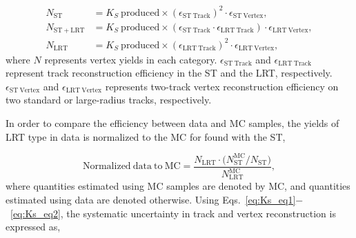 \begin{align}
    N_{\mathrm{ST}}  &= K_{S}~\mathrm{produced} \times (\epsilon_{\mathrm{ST~Track}})^{2} \cdot \epsilon_{\mathrm{ST~Vertex}}, \nonumber \\
    N_{\mathrm{ST+LRT}}  &= K_{S}~\mathrm{produced} \times (\epsilon_{\mathrm{ST~Track}} \cdot \epsilon_{\mathrm{LRT~Track}}) \cdot \epsilon_{\mathrm{LRT~Vertex}}, \nonumber \\
    N_{\mathrm{LRT}}&= K_{S}~\mathrm{produced} \times (\epsilon_{\mathrm{LRT~Track}})^{2} \cdot \epsilon_{\mathrm{LRT~Vertex}},
\label{eq:Ks_eq1}
\end{align}
%
where $N$ represents vertex yields in each category. $\epsilon_{\mathrm{ST~Track}}$ and $\epsilon_{\mathrm{LRT~Track}}$ represent track reconstruction efficiency in the ST and the LRT, respectively. $\epsilon_{\mathrm{ST~Vertex}}$ and $\epsilon_{\mathrm{LRT~Vertex}}$ represents two-track vertex reconstruction efficiency on two standard or large-radius tracks, respectively.

In order to compare the efficiency between data and MC samples, the \Ks yields of LRT type in data is normalized to the MC for \Ks found with the ST,

\begin{equation}
\mathrm{Normalized~data~to~MC} = \dfrac{N_{\mathrm{LRT}} \cdot \Big(N_{\mathrm{ST}}^{\mathrm{MC}} / N_{\mathrm{ST}}\Big)}{N_{\mathrm{LRT}}^{\mathrm{MC}}},
\label{eq:Ks_eq2}
\end{equation}
%
where quantities estimated using MC samples are denoted by MC, and quantities estimated using data are denoted otherwise. Using Eqs.~\ref{eq:Ks_eq1}$-$~\ref{eq:Ks_eq2}, the systematic uncertainty in track and vertex reconstruction is expressed as,


